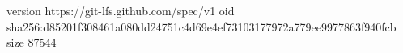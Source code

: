 version https://git-lfs.github.com/spec/v1
oid sha256:d85201f308461a080dd24751c4d69e4ef73103177972a779ee9977863f940fcb
size 87544
